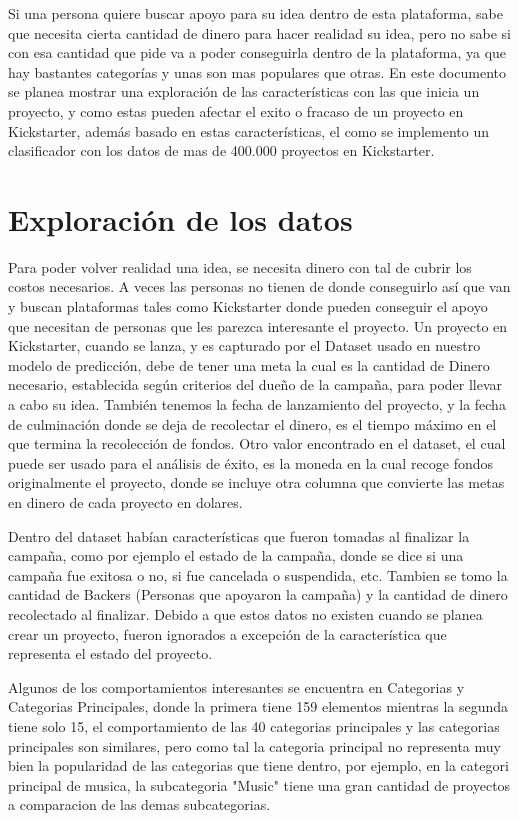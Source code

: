 \documentclass[journal]{IEEEtran}
\begin{document}
Si una persona quiere buscar apoyo para su idea dentro de esta plataforma, sabe que necesita cierta cantidad de dinero para hacer realidad su idea, pero no sabe si con esa cantidad que pide va a poder conseguirla dentro de la plataforma, ya que hay bastantes categorías y unas son mas populares que otras. En este documento se planea mostrar una exploración de las características con las que inicia un proyecto, y como estas pueden afectar el exito o fracaso de un proyecto en Kickstarter, además basado en estas características, el como se implemento un clasificador con los datos de mas de 400.000 proyectos en Kickstarter. 

\section{Exploración de los datos}
Para poder volver realidad una idea, se necesita dinero con tal de cubrir los costos necesarios. A veces las personas no tienen de donde conseguirlo así que van y buscan plataformas tales como Kickstarter donde pueden conseguir el apoyo que necesitan de personas que les parezca interesante el proyecto. Un proyecto en Kickstarter, cuando se lanza, y es capturado por el Dataset usado en nuestro modelo de predicción, debe de tener una meta la cual es la cantidad de Dinero necesario, establecida según criterios del dueño de la campaña, para poder llevar a cabo su idea. También tenemos la fecha de lanzamiento del proyecto, y la fecha de culminación donde se deja de recolectar el dinero, es el tiempo máximo en el que termina la recolección de fondos. Otro valor encontrado en el dataset, el cual puede ser usado para el análisis de  éxito, es la moneda en la cual recoge fondos originalmente el proyecto, donde se incluye otra columna que convierte las metas en dinero de cada proyecto en dolares.

Dentro del dataset habían características que fueron tomadas al finalizar la campaña, como por ejemplo el estado de la campaña, donde se dice si una campaña fue exitosa o no, si fue cancelada o suspendida, etc. Tambien se tomo la cantidad de Backers (Personas que apoyaron la campaña) y la cantidad de dinero recolectado al finalizar. Debido a que estos datos no existen cuando se planea crear un proyecto, fueron ignorados a excepción de la característica que representa el estado del proyecto.

Algunos de los comportamientos interesantes se encuentra en Categorias y Categorias Principales, donde la primera tiene 159 elementos mientras la segunda tiene solo 15, el comportamiento de las 40 categorias principales y las categorias principales son similares, pero como tal la categoria principal no representa muy bien la popularidad de las categorias que tiene dentro, por ejemplo, en la categori principal de musica, la subcategoria "Music" tiene una gran cantidad de proyectos a comparacion de las demas subcategorias.
\end{document}
